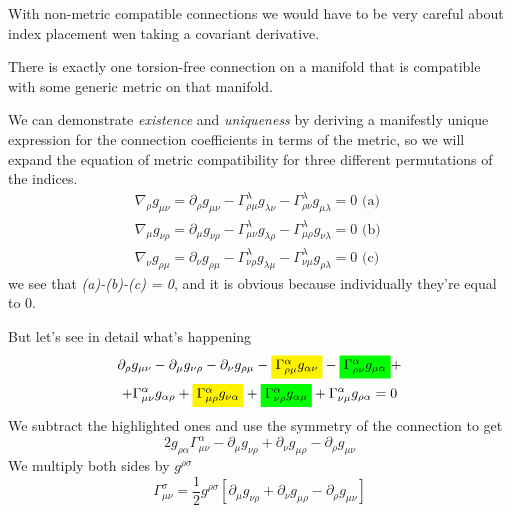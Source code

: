 With non-metric compatible connections we would have to be very careful about index placement wen taking a covariant derivative. \par
There is exactly one torsion-free connection on a manifold that is compatible with some generic metric on that manifold. \par

We can demonstrate \emph{existence} and \emph{uniqueness} by deriving a manifestly unique expression for the connection coefficients in terms of the metric, so we will expand the equation of metric compatibility for three different permutations of the indices.
\begin{gather*}
\nabla _{\rho }g_{\mu \nu } = \partial_{\rho }g_{\mu \nu } - \Gamma ^{\lambda }_{\rho \mu }g_{ \lambda \nu  } - \Gamma ^{\lambda }_{\rho \nu } g_{\mu \lambda }=0  \text{ (a) }\\
\nabla _{\mu }g_{\nu \rho } = \partial_{\mu }g_{\nu \rho } - \Gamma ^{\lambda }_{\mu \nu }g_{\lambda \rho } - \Gamma ^{\lambda }_{\mu \rho }g_{\nu \lambda } =0 \text{ (b) }\\
\nabla _{\nu }g_{\rho \mu } = \partial_{\nu }g_{\rho \mu } - \Gamma ^{\lambda }_{\nu \rho } g_{\lambda \mu } - \Gamma ^{\lambda }_{\nu \mu } g_{\rho  \lambda } = 0 \text{ (c) }
\end{gather*}
we see that \emph{(a)-(b)-(c) = 0}, and it is obvious because individually they're equal to 0. \par
But let's see in detail what's happening
\begin{gather*}
\partial_{\rho }g_{\mu \nu } - \partial_{\mu }g_{\nu \rho } - \partial_{\nu }g_{\rho \mu } - \colorbox{yellow}{$ \Gamma^{\alpha }_{\rho \mu }g_{\alpha \nu }  $} - \colorbox{green}{$ \Gamma ^{\alpha }_{\rho \nu }g_{\mu \alpha }  $} + \\
 + \Gamma ^{\alpha }_{\mu \nu }g_{\alpha \rho } + \colorbox{yellow}{$ \Gamma^{\alpha }_{\mu \rho }g_{\nu \alpha }  $} + \colorbox{green}{$ \Gamma ^{\alpha }_{\nu \rho }g_{\alpha \mu }  $} + \Gamma ^{\alpha }_{\nu \mu }g_{\rho \alpha } = 0 \\
\end{gather*}
 We subtract the highlighted ones and use the symmetry of the connection to get
 \[
 2g_{\rho \alpha }\Gamma ^{\alpha }_{\mu \nu } - \partial_{\mu }g_{\nu \rho } + \partial_{\nu }g_{\mu \rho } - \partial_{\rho }g_{\mu \nu }
 \]
 We multiply both sides by $g^{\rho \sigma }$	
\begin{equation}
	\Gamma^{\sigma }_{\mu \nu } = \frac{1}{2} g^{\rho \sigma } [\partial_{\mu } g_{\nu \rho } + \partial_{\nu } g_{\mu \rho } - \partial_{\rho }g_{\mu \nu } ]
\end{equation}
